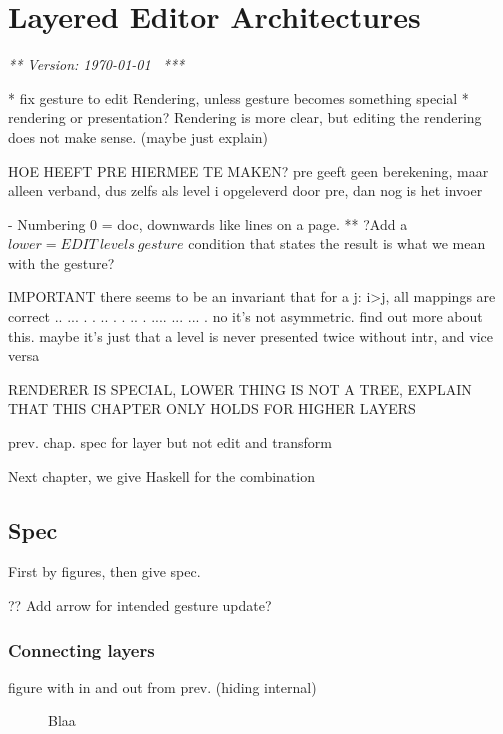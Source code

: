 \chapter{Layered Editor Architectures}
\label{chap:layeredArchs}
{\em *** Version: \today~ ***}



\bc
* fix gesture to edit Rendering, unless gesture becomes something special
* rendering or presentation? Rendering is more clear, but editing the rendering does not make sense. (maybe just explain)

HOE HEEFT PRE HIERMEE TE MAKEN? pre geeft geen berekening, maar alleen verband, dus zelfs als level i opgeleverd door pre, dan nog is het invoer

- Numbering 0 = doc, downwards like lines on a page.
** ?Add a $lower = EDIT~levels~gesture$ condition that states the result is what we mean with the gesture?



IMPORTANT there seems to be an invariant that for a j:  i>j, all mappings are correct 
  ..           ...       
 .  .    ..   .   .   .. 
.    ....  ...     ...  .
 no it's not asymmetric. find out more about this.
 maybe it's just that a level is never presented twice without intr, and vice versa

RENDERER IS SPECIAL, LOWER THING IS NOT A TREE, EXPLAIN THAT THIS CHAPTER ONLY HOLDS FOR HIGHER LAYERS


\ec




prev. chap. spec for layer but not edit and transform

Next chapter, we give Haskell for the combination

\section{Spec}

First by figures, then give spec.


?? Add arrow for intended gesture update?

\subsection{Connecting layers}

figure with in and out from prev. (hiding internal)

\begin{figure}\begin{small}\begin{center}\begin{center}
\end{center}
\caption{Blaa}\label{singleToMulti} 
\end{center}\end{small}\end{figure}

